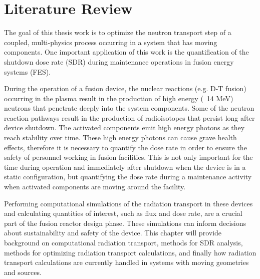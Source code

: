 \chapter{Literature Review} \label{ch:litrev}

The goal of this thesis work is to optimize the neutron transport step of a
coupled, multi-physics process occurring in a system that has moving components.  One
important application of this work is the quantification of the shutdown dose
rate (SDR) during maintenance operations in fusion energy systems (FES).

During the operation of a fusion device, the nuclear reactions (e.g. D-T
fusion) occurring in the plasma result in the production of high energy (~14 MeV) neutrons
that penetrate deeply into the system components.  Some of the neutron reaction
pathways result in the production of radioisotopes that persist long after
device shutdown.  The activated components emit high energy photons as they
reach stability over time.  These high energy photons
can cause grave health effects, therefore it is necessary to     
quantify the dose rate in order to ensure the safety of personnel working in
fusion facilities.  This is not only important for the time during operation
and immediately after shutdown when the device is in a static configuration,
but quantifying the dose rate during a maintenance activity when activated
components are moving around the facility.

Performing computational simulations of the radiation transport in these
devices and calculating quantities of interest, such as flux and dose rate, are
a crucial part of the fusion reactor design phase.  These simulations can
inform decisions about sustainability and safety of the device.  
This chapter will provide background on computational radiation
transport, methods for SDR analysis, methods for optimizing radiation transport
calculations, and finally  how radiation transport calculations are currently
handled in systems with moving geometries and sources.





